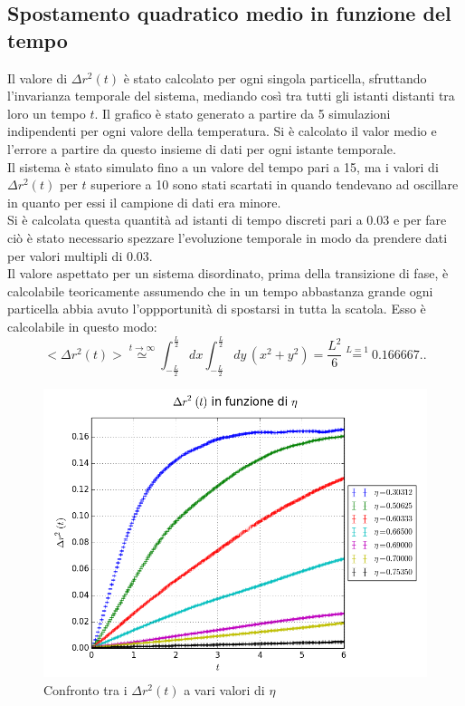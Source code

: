 \subsection{Spostamento quadratico medio in funzione del tempo}
Il valore di $\Delta r^2(t)$ è stato calcolato per ogni singola particella, sfruttando l'invarianza temporale del sistema, mediando così tra tutti gli istanti distanti tra loro un tempo $t$. 
Il grafico è stato generato a partire da 5 simulazioni indipendenti per ogni valore della temperatura. Si è calcolato il valor medio e l'errore a partire da questo insieme di dati per ogni istante temporale.\\
Il sistema è stato simulato fino a un valore del tempo pari a 15, ma i valori di $\Delta r^2(t)$ per $t$ superiore a 10 sono stati scartati in quando tendevano ad oscillare in quanto per essi il campione di dati era minore.\\
Si è calcolata questa quantità ad istanti di tempo discreti pari a 0.03 e per fare ciò è stato necessario spezzare l'evoluzione temporale in modo da prendere dati per valori multipli di 0.03.\\
Il valore aspettato per un sistema disordinato, prima della transizione di fase, è calcolabile teoricamente assumendo che in un tempo abbastanza grande ogni particella abbia avuto l'oppportunità di spostarsi in tutta la scatola. Esso è calcolabile in questo modo:
$$
<\Delta r^2(t)> \overset{\mathit{t\rightarrow \infty}}{\simeq} \int_{-\frac{L}{2}}^{\frac{L}{2}} dx \int_{-\frac{L}{2}}^{\frac{L}{2}}dy \, (x^2 + y^2 )= \frac{L^2}{6} \overset{\mathit{L=1}}{=} 0.166667..
$$
\begin{center}
	\begin{figure}[h]
	\centering
		\includegraphics[scale=0.5]{sfere2D/dr2vari.png}
	\caption{Confronto tra i $\Delta r^2(t)$ a vari valori di $\eta$}
	\end{figure}
\end{center}

